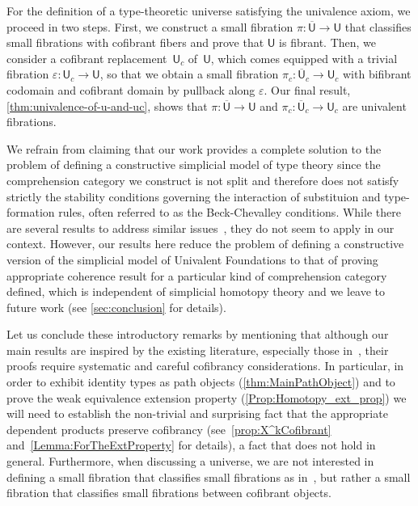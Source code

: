 \documentclass[reqno,10pt,a4paper,oneside,draft]{amsart}
\numberwithin{equation}{section}
\theoremstyle{mythm}
\theoremstyle{mydef}
\theoremstyle{myrmk}
\newcommand{\co}{\colon}
\newcommand{\UU}{\overline{\mathsf{U}}}
\newcommand{\U}{\mathsf{U}}
\begin{document}
For the definition of a  type-theoretic universe satisfying the univalence axiom, we proceed
in two steps. First, we construct a small fibration $\pi \co \UU \to \U$ that classifies small fibrations with cofibrant fibers and prove that $\U$ is fibrant. 
Then, we consider a cofibrant replacement~$\U_c$ of~$\U$, which comes equipped with a trivial fibration $\varepsilon \co \U_c \to \U$, so that 
we obtain a small fibration $\pi_c \co \UU_c \to \U_c$ with bifibrant codomain and cofibrant domain by pullback along $\varepsilon$. Our final result, \cref{thm:univalence-of-u-and-uc}, shows that
$\pi \co \UU \to \U$ and $\pi_c \co \UU_c \to \U_c$ are univalent fibrations. 





We refrain from claiming that our work provides a complete solution to the problem of defining a constructive simplicial model of type theory since the comprehension category we construct is not split and therefore does not
satisfy strictly the stability conditions governing the interaction of substituion and type-formation rules, often
referred to as the Beck-Chevalley conditions. While there are several results to address similar issues~\cite{clairambaultdybjer2014,HofmannM:intttl,voevodsky-simplicial-model,LumsdaineP:locuoc,ShulmanM:allths}, they do not seem to apply in our  context. However, our results here reduce the problem of defining a constructive version of the simplicial model of Univalent Foundations to that of proving appropriate coherence result for a particular kind of 
comprehension category defined, which is independent of simplicial homotopy theory  and we leave to future work (see \cref{sec:conclusion} for
details).

Let us conclude these introductory remarks by mentioning that although our main results are inspired by the existing literature, especially those in~\cite{voevodsky-simplicial-model}, their proofs require systematic and careful cofibrancy considerations. In particular, in order to 
exhibit identity types as path objects (\cref{thm:MainPathObject}) and to prove the weak equivalence
extension property (\cref{Prop:Homotopy_ext_prop}) we will need to establish the non-trivial
and surprising fact that the appropriate dependent products preserve cofibrancy (see~\cref{prop:X^kCofibrant} and~\cref{Lemma:ForTheExtProperty} for details), a 
fact that does not hold in general. Furthermore, when discussing a universe, we are not interested in defining a small fibration that classifies small fibrations as in~\cite{voevodsky-simplicial-model}, but
rather a small fibration that classifies small fibrations between cofibrant objects. 
\end{document}
